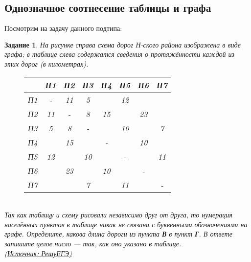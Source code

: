 \documentclass[12pt]{article}
\theoremstyle{problem_style}
\newtheorem{problem}{Задание}[subsection]
\begin{document}
\subsection{Однозначное соотнесение таблицы и графа}\label{nonambig_match}
Посмотрим на задачу данного подтипа:
\begin{problem}
На рисунке справа схема дорог Н-ского района изображена в виде графа; в таблице слева содержатся сведения о протяжённости каждой из этих дорог (в километрах).
\begin{figure}[h]
    \centering
    \begin{minipage}[t!]{0.45\textwidth}
        \centering
        \begin{tabular}{|c|c|c|c|c|c|c|c|} \hline
             & П1 & П2 & П3 & П4 & П5 & П6 & П7 \\ \hline
            П1 & - & 11 & 5 &  & 12 &  & \\ \hline
            П2 & 11 & - & 8 & 15 & & 23 & \\ \hline
            П3 & 5 & 8 & - &  & 10 &  & 7\\ \hline
            П4 &  & 15 &  & - &  & 10 & \\ \hline
            П5 & 12 &  & 10 &  & - &  & 11 \\ \hline
            П6 &  & 23 &  & 10 &  & - & \\ \hline
            П7 &  &  & 7 &  & 11 &  & -\\ \hline
        \end{tabular}
    \end{minipage}
    \hfill
    \begin{minipage}[t!]{0.45\textwidth}
        \centering
    \end{minipage}
\end{figure}\\
Так как таблицу и схему рисовали независимо друг от друга, то нумерация населённых пунктов в таблице никак не связана с буквенными обозначениями на графе. Определите, какова длина дороги из пункта \textbf{В} в пункт \textbf{Г}. В ответе запишите целое число — так, как оно указано в таблице. \\
(\href{https://inf-ege.sdamgia.ru/}{Источник: РешуЕГЭ)} %
\end{problem}
\end{document}
